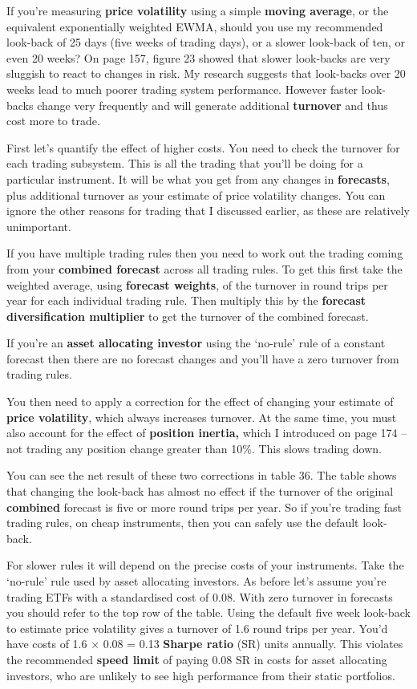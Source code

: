 If you're measuring \textbf{price volatility} using a simple \textbf{moving average}, or the equivalent exponentially weighted EWMA, should you use my recommended look-back of 25 days (five weeks of trading days), or a slower look-back of ten, or even 20 weeks? On page 157, figure 23 showed that slower look-backs are very sluggish to react to changes in risk. My research suggests that look-backs over 20 weeks lead to much poorer trading system performance. However faster look-backs change very frequently and will generate additional \textbf{turnover} and thus cost more to trade.

First let's quantify the effect of higher costs. You need to check the turnover for each trading subsystem. This is all the trading that you'll be doing for a particular instrument. It will be what you get from any changes in \textbf{forecasts}, plus additional turnover as your estimate of price volatility changes. You can ignore the other reasons for trading that I discussed earlier, as these are relatively unimportant.

If you have multiple trading rules then you need to work out the trading coming from your \textbf{combined forecast} across all trading rules. To get this first take the weighted average, using \textbf{forecast weights}, of the turnover in round trips per year for each individual trading rule. Then multiply this by the \textbf{forecast diversification multiplier} to get the turnover of the combined forecast.

If you're an \textbf{asset allocating investor} using the ‘no-rule' rule of a constant forecast then there are no forecast changes and you'll have a zero turnover from trading rules.

You then need to apply a correction for the effect of changing your estimate of \textbf{price volatility}, which always increases turnover. At the same time, you must also account for the effect of \textbf{position inertia,} which I introduced on page 174 -- not trading any position change greater than 10\%. This slows trading down.

You can see the net result of these two corrections in table 36. The table shows that changing the look-back has almost no effect if the turnover of the original \textbf{combined} forecast is five or more round trips per year. So if you're trading fast trading rules, on cheap instruments, then you can safely use the default look-back.

For slower rules it will depend on the precise costs of your instruments. Take the ‘no-rule' rule used by asset allocating investors. As before let's assume you're trading ETFs with a standardised cost of 0.08. With zero turnover in forecasts you should refer to the top row of the table. Using the default five week look-back to estimate price volatility gives a turnover of 1.6 round trips per year. You'd have costs of 1.6 × 0.08 = 0.13 \textbf{Sharpe ratio} (SR) units annually. This violates the recommended \textbf{speed limit} of paying 0.08 SR in costs for asset allocating investors, who are unlikely to see high performance from their static portfolios.

